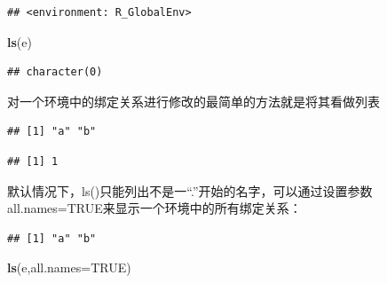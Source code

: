 \documentclass[]{book}
\newenvironment{Shaded}{\begin{snugshade}}{\end{snugshade}}
\newcommand{\KeywordTok}[1]{\textcolor[rgb]{0.13,0.29,0.53}{\textbf{#1}}}
\newcommand{\DataTypeTok}[1]{\textcolor[rgb]{0.13,0.29,0.53}{#1}}
\newcommand{\DecValTok}[1]{\textcolor[rgb]{0.00,0.00,0.81}{#1}}
\newcommand{\StringTok}[1]{\textcolor[rgb]{0.31,0.60,0.02}{#1}}
\newcommand{\OtherTok}[1]{\textcolor[rgb]{0.56,0.35,0.01}{#1}}
\newcommand{\OperatorTok}[1]{\textcolor[rgb]{0.81,0.36,0.00}{\textbf{#1}}}
\newcommand{\NormalTok}[1]{#1}
\begin{document}
\begin{verbatim}
## <environment: R_GlobalEnv>
\end{verbatim}

\begin{Shaded}
\begin{Highlighting}[]
\KeywordTok{ls}\NormalTok{(e)}
\end{Highlighting}
\end{Shaded}

\begin{verbatim}
## character(0)
\end{verbatim}

对一个环境中的绑定关系进行修改的最简单的方法就是将其看做列表

\begin{Shaded}
\end{Shaded}

\begin{verbatim}
## [1] "a" "b"
\end{verbatim}

\begin{Shaded}
\end{Shaded}

\begin{verbatim}
## [1] 1
\end{verbatim}

默认情况下，ls()只能列出不是一``.''开始的名字，可以通过设置参数all.names=TRUE来显示一个环境中的所有绑定关系：

\begin{Shaded}
\end{Shaded}

\begin{verbatim}
## [1] "a" "b"
\end{verbatim}

\begin{Shaded}
\begin{Highlighting}[]
\KeywordTok{ls}\NormalTok{(e,}\DataTypeTok{all.names=}\OtherTok{TRUE}\NormalTok{)}
\end{Highlighting}
\end{Shaded}
\end{document}
